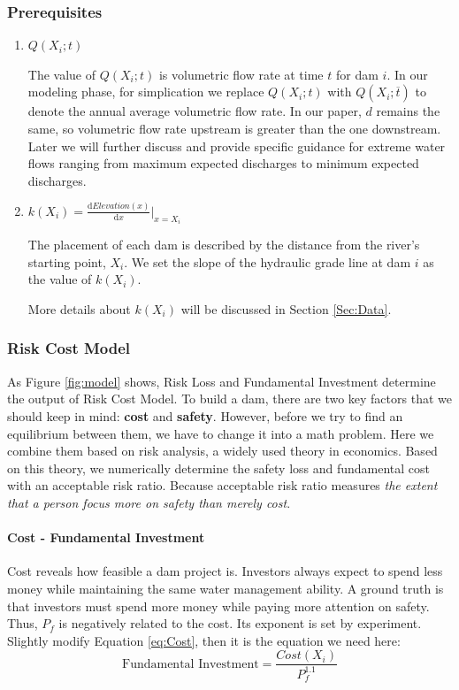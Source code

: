 \documentclass{mcmthesis}
\begin{document}
\subsubsection{Prerequisites}
\begin{enumerate}
	\item$Q(X_i;t)$

The value of $Q(X_i;t)$ is volumetric flow rate at time $t$ for dam $i$. In our modeling phase, for simplication we replace $Q(X_i;t)$ with $Q(X_i;\overline{t})$ to denote the annual average volumetric flow rate. In our paper, $d$ remains the same, so volumetric flow rate upstream is greater than the one downstream.\\
Later we will further discuss and provide specific guidance for extreme water flows ranging from maximum expected discharges to minimum expected discharges.
	\item$k(X_i) = \frac{\mathrm{d}	Elevation(x)}{\mathrm{d}x}|_{x=X_i}$

The placement of each dam is described by the distance from the river's starting point, $X_i$. We set the slope of the hydraulic grade line at dam $i$ as the value of $k(X_i)$.

More details about $k(X_i)$ will be discussed in Section \ref{Sec:Data}.
\end{enumerate}

\subsubsection{Risk Cost Model}
As Figure \ref{fig:model} shows, Risk Loss and Fundamental Investment determine the output of Risk Cost Model. To build a dam, there are two key factors that we should keep in mind: \textbf{cost} and \textbf{safety}. However, before we try to find an equilibrium between them, we have to change it into a math problem. Here we combine them based on risk analysis, a widely used theory in economics. Based on this theory, we numerically determine the safety loss and fundamental cost with an acceptable risk ratio. Because acceptable risk ratio measures \emph{the extent that a person focus more on safety than merely cost}.
\paragraph{Cost - Fundamental Investment} Cost reveals how feasible a dam project is. Investors always expect to spend less money while maintaining the same water management ability. A ground truth is that investors must spend more money while paying more attention on safety. Thus, $P_f$ is negatively related to the cost. Its exponent is set by experiment. Slightly modify Equation \eqref{eq:Cost}, then it is the equation we need here:
\begin{equation}
\label{eq:Fund}
\text{Fundamental Investment} = \frac{Cost(X_i)}{P_f^{1.1}}
\end{equation}
\end{document}
